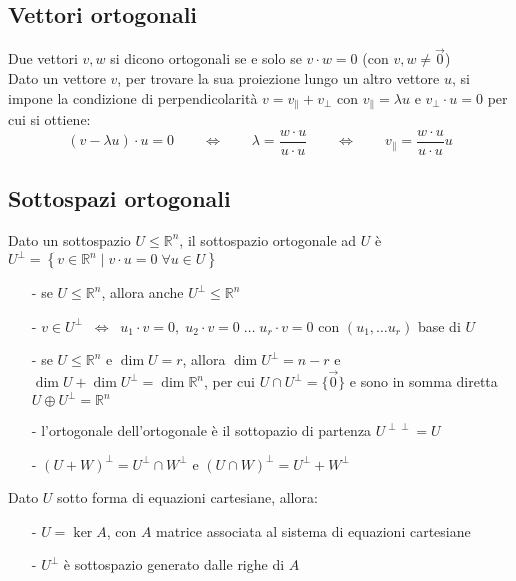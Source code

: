 \documentclass[a4paper]{article}
\begin{document}
\subsection{Vettori ortogonali}
Due vettori \(v,w\) si dicono ortogonali se e solo se \(v \cdot w = 0\) (con \(v, w \neq \vec{0}\)) \\
Dato un vettore \(v\), per trovare la sua proiezione lungo un altro vettore \(u\), si impone la condizione di perpendicolarità
\(v = v_\parallel + v_\perp\) con \(v_\parallel = \lambda u\) e \(v_\perp \cdot u = 0\) per cui si ottiene:
\[(v - \lambda u) \cdot u = 0 \qquad \Leftrightarrow \qquad \lambda = \frac{w \cdot u}{u \cdot u} \qquad \Leftrightarrow \qquad v_\parallel = \frac{w \cdot u}{u \cdot u} u\]

\newpage

\subsection{Sottospazi ortogonali}
Dato un sottospazio \(U \leq \mathbb{R}^n\), il sottospazio ortogonale ad \(U\) è \(U^\perp = \left\{ v \in \mathbb{R}^n \; | \; v \cdot u = 0 \; \forall u \in U \right\}\)
\begin{itemize}[topsep=3pt, itemsep=0pt]
	\item[-] se \(U \leq \mathbb{R}^n\), allora anche \(U^\perp \leq \mathbb{R}^n\)
	\item[-] \(v \in U^\perp \;\; \Leftrightarrow \;\; u_1 \cdot v = 0, \; u_2 \cdot v = 0 \; \dots \; u_r \cdot v = 0\) con \((u_1, \dots u_r)\) base di \(U\)
	\item[-] se \(U \leq \mathbb{R}^n\) e \(\dim U = r\), allora \(\dim U^\perp = n-r\) e \(\dim U + \dim U^\perp = \dim \mathbb{R}^n\), per cui \(U \cap U^\perp = \{ \vec{0} \}\)
	e sono in somma diretta \(U \oplus U^\perp = \mathbb{R}^n\)
	\item[-] l'ortogonale dell'ortogonale è il sottopazio di partenza \(U^{\perp\perp} = U\)
	\item[-] \((U+W)^\perp = U^\perp \cap W^\perp\) e \((U \cap W)^\perp = U^\perp + W^\perp\)
\end{itemize}
Dato \(U\) sotto forma di equazioni cartesiane, allora:
\begin{itemize}[topsep=3pt, itemsep=0pt]
	\item[-] \(U = \ker A\), con \(A\) matrice associata al sistema di equazioni cartesiane
	\item[-] \(U^\perp\) è sottospazio generato dalle righe di \(A\)
\end{itemize}
\end{document}

